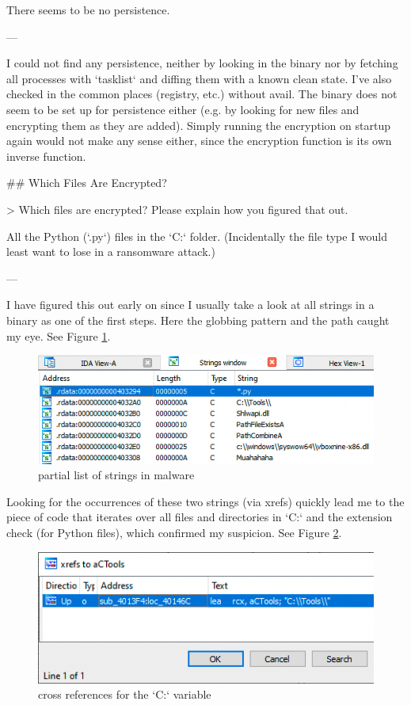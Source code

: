 \begin{markdown}
\noindent There seems to be no persistence.

---

\noindent I could not find any persistence, neither by looking in the binary nor by fetching all processes with `tasklist` and diffing them with a known clean state.
I've also checked in the common places (registry, etc.) without avail.
\n
The binary does not seem to be set up for persistence either (e.g. by looking for new files and encrypting them as they are added).
Simply running the encryption on startup again would not make any sense either, since the encryption function is its own inverse function.

## Which Files Are Encrypted?

> Which files are encrypted? Please explain how you figured that out.

\noindent All the Python (`.py`) files in the `C:\Tools` folder. (Incidentally the file type I would least want to lose in a ransomware attack.)

---

\noindent I have figured this out early on since I usually take a look at all strings in a binary as one of the first steps. Here the globbing pattern and the path caught my eye. See Figure \ref{dstrings}.

\begin{figure}[!htbp]
\centering
\includegraphics[width=\linewidth]{media/dstrings.png}
\caption{partial list of strings in malware}\label{dstrings}
\end{figure}

\noindent Looking for the occurrences of these two strings (via xrefs) quickly lead me to the piece of code that iterates over all files and directories in `C:\Tools` and the extension check (for Python files), which confirmed my suspicion. See Figure \ref{xrefs}.

\begin{figure}[!htbp]
\centering
\includegraphics[width=\linewidth]{media/xrefs.png}
\caption{cross references for the `C:\Tools` variable}\label{xrefs}
\end{figure}


\end{markdown}
